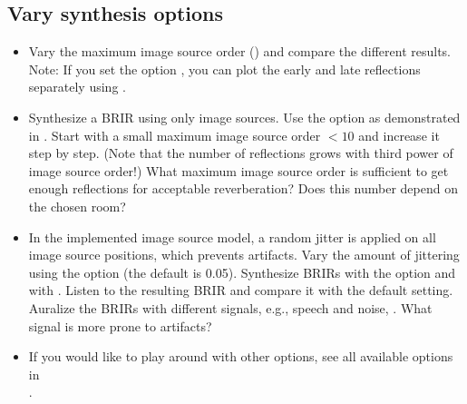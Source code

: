 \documentclass[a4paper, fleqn, 11pt]{article}
\begin{document}
\subsection{Vary synthesis options}
\label{task:op}
\begin{itemize}
  \item Vary the maximum image source order () and compare the different results. Note: If you set the option , you can plot the early and late reflections separately using .
  
  \item Synthesize a BRIR using only image sources. Use the option  as demonstrated in . Start with a small maximum image source order $< 10$ and increase it step by step. (Note that the number of reflections grows with third power of image source order!) What maximum image source order is sufficient to get enough reflections for acceptable reverberation? Does this number depend on the chosen room?
  
  \item In the implemented image source model, a random jitter is applied on all image source positions, which prevents  artifacts. Vary the amount of jittering using the option  (the default is 0.05). Synthesize BRIRs with the  option and with . Listen to the resulting BRIR and compare it with the default setting. Auralize the BRIRs with different signals, e.g., speech and noise,
  . What signal is more prone to artifacts?
  
  \item If you would like to play around with other options, see all available options in\\
  .
\end{itemize}

\end{document}
